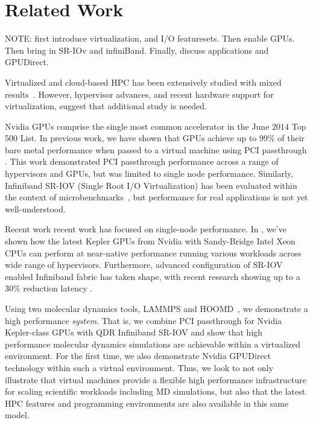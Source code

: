 \documentclass[times,10pt,twocolumn,conference]{IEEEtran}
\begin{document}
\section{Related Work}

NOTE: first introduce virtualization, and I/O featuresets. Then enable GPUs. Then bring in SR-IOv and infiniBand. Finally, discuss applications and GPUDirect.

Virtualized and cloud-based HPC has been extensively studied with mixed results~\cite{Younge2011cloud}.  However, hypervisor advances, and recent hardware support for virtualization, suggest that additional study is needed. 

Nvidia GPUs comprise the single most common accelerator in the June 2014 Top 500 List.  In previous work, we have shown that GPUs achieve up to 99\% of their bare metal performance when passed to a virtual machine using PCI passthrough \cite{Walters2014cloud}.  This work demonstrated PCI passthrough performance across a range of hypervisors and GPUs, but was limited to single node performance.  Similarly, Infiniband SR-IOV (Single Root I/O Virtualization) has been evaluated within the context of microbenchmarks~\cite{SRIOVInfiniband,Musleh2014cloud}, but performance for real applications is not yet well-understood.

Recent work recent work has focused on single-node performance.  In \cite{walters2014}, we've shown how the latest Kepler GPUs from Nvidia  with Sandy-Bridge Intel Xeon CPUs can perform at near-native performance running various workloads across wide range of hypervisors. Furthermore, advanced configuration of SR-IOV enabled Infiniband fabric has taken shape, with recent research showing up to a 30\% reduction latency \cite{musleh2014}.  


Using two molecular dynamics tools, LAMMPS\cite{plimpton2007lammps} and HOOMD~\cite{anderson2010hoomd}, we demonstrate a high performance \textit{system}.  That is, we combine PCI passthrough for Nvidia Kepler-class GPUs with QDR Infiniband SR-IOV and show that high performance molecular dynamics simulations are achievable within a virtualized environment.  For the first time, we also demonstrate Nvidia GPUDirect technology within such a virtual environment.  Thus, we look to not only illustrate that virtual machines provide a flexible high performance infrastructure for scaling scientific workloads including MD simulations, but also that the latest HPC features and programming environments are also available in this same model.  
\end{document}
